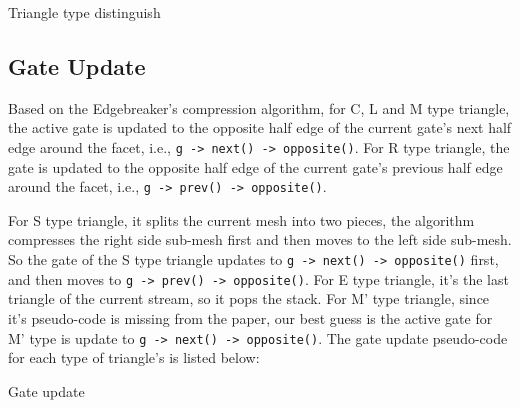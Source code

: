 \documentclass[onecolumn, 12pt]{article}
\begin{document}
{\begin{algorithm}[H]
\caption{Triangle type distinguish}
\begin{algorithmic}[1]
\ELSE
        \ELSE
        \ENDIF
    \ELSE
        \ELSE
        \ENDIF
    \ENDIF
\ENDIF
\end{algorithmic}
\end{algorithm}


\subsection{Gate Update} \label{sec:gateUpdate}
Based on the Edgebreaker's compression algorithm, for C, L and M type triangle, the active gate is updated to the opposite half edge of the current gate's next half edge around the facet, i.e., \lstinline!g -> next() -> opposite()!. For R type triangle, the gate is updated to the opposite half edge of the current gate's previous half edge around the facet, i.e., \lstinline!g -> prev() -> opposite()!.

For S type triangle, it splits the current mesh into two pieces, the algorithm compresses the right side sub-mesh first and then moves to the left side sub-mesh. So the gate of the S type triangle updates to \lstinline!g -> next() -> opposite()! first, and then moves to \lstinline!g -> prev() -> opposite()!. For E type triangle, it's the last triangle of the current stream, so it pops the stack. For M' type triangle, since it's pseudo-code is missing from the paper, our best guess is the active gate for M' type is update to \lstinline!g -> next() -> opposite()!. The gate update pseudo-code for each type of triangle's is listed below:

\begin{algorithm}[H]
\caption{Gate update}
\begin{algorithmic}[1]
\ENDIF
\end{algorithmic}
\end{algorithm}


}
\end{document}
